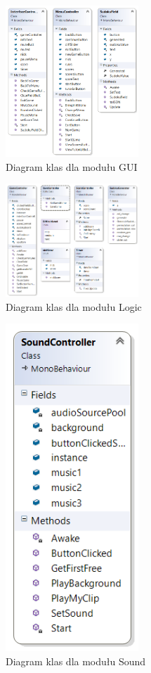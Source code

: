 \documentclass[a4paper, 11pt]{article}
\begin{document}
\begin{figure}[H]
	\centering
	\includegraphics[width=5cm]{diagramy/class_gui.png}
	\caption{Diagram klas dla modułu GUI}
	\label{fig:class_gui}
\end{figure}
\begin{figure}[H]
	\centering
	\includegraphics[width=5cm]{diagramy/class_logic.png}
	\caption{Diagram klas dla modułu Logic}
	\label{fig:class_logic}
\end{figure}
\begin{figure}[H]
	\centering
	\includegraphics[width=5cm]{diagramy/class_sound.png}
	\caption{Diagram klas dla modułu Sound}
	\label{fig:class_sound}
\end{figure}
\end{document}
